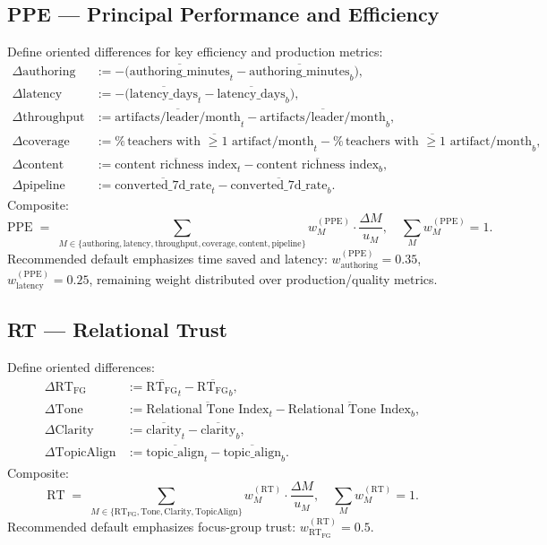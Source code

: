 \documentclass[11pt]{article}
\newcommand{\PPE}{\mathrm{PPE}}
\newcommand{\RT}{\mathrm{RT}}
\begin{document}
\subsection{PPE — Principal Performance and Efficiency}
Define oriented differences for key efficiency and production metrics:
\begin{align}
\Delta \text{authoring} &:= -\bigl(\overline{\text{authoring\_minutes}}_{t} - \overline{\text{authoring\_minutes}}_{b}\bigr),\\
\Delta \text{latency} &:= -\bigl(\overline{\text{latency\_days}}_{t} - \overline{\text{latency\_days}}_{b}\bigr),\\
\Delta \text{throughput} &:= \overline{\text{artifacts/leader/month}}_{t} - \overline{\text{artifacts/leader/month}}_{b},\\
\Delta \text{coverage} &:= \overline{\%\,\text{teachers with $\ge 1$ artifact/month}}_{t} - \overline{\%\,\text{teachers with $\ge 1$ artifact/month}}_{b},\\
\Delta \text{content} &:= \overline{\text{content richness index}}_{t} - \overline{\text{content richness index}}_{b},\\
\Delta \text{pipeline} &:= \overline{\text{converted\_7d\_rate}}_{t} - \overline{\text{converted\_7d\_rate}}_{b} .
\end{align}
Composite:
\begin{equation}
\PPE \;=\; \sum_{M \in \{\text{authoring},\text{latency},\text{throughput},\text{coverage},\text{content},\text{pipeline}\}} w^{(\PPE)}_M \cdot \frac{\Delta M}{u_M} , \quad \sum_M w^{(\PPE)}_M=1.
\end{equation}
Recommended default emphasizes time saved and latency: $w^{(\PPE)}_{\text{authoring}}=0.35$, $w^{(\PPE)}_{\text{latency}}=0.25$, remaining weight distributed over production/quality metrics.

\subsection{RT — Relational Trust}
Define oriented differences:
\begin{align}
\Delta \RT_{\mathrm{FG}} &:= \overline{\RT_{\mathrm{FG}}}_{t} - \overline{\RT_{\mathrm{FG}}}_{b},\\
\Delta \text{Tone} &:= \overline{\text{Relational Tone Index}}_{t} - \overline{\text{Relational Tone Index}}_{b},\\
\Delta \text{Clarity} &:= \overline{\text{clarity}}_{t} - \overline{\text{clarity}}_{b},\\
\Delta \text{TopicAlign} &:= \overline{\text{topic\_align}}_{t} - \overline{\text{topic\_align}}_{b} .
\end{align}
Composite:
\begin{equation}
\RT \;=\; \sum_{M \in \{\RT_{\mathrm{FG}},\text{Tone},\text{Clarity},\text{TopicAlign}\}} w^{(\RT)}_M \cdot \frac{\Delta M}{u_M} , \quad \sum_M w^{(\RT)}_M=1.
\end{equation}
Recommended default emphasizes focus-group trust: $w^{(\RT)}_{\RT_{\mathrm{FG}}}=0.5$.
\end{document}
